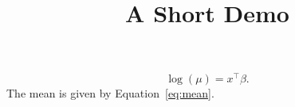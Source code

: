 \documentclass[article]{jss}
\title{A Short Demo}
\begin{document}
\begin{equation} \label{eq:mean}
\log(\mu) = x^\top \beta.
\end{equation}
The mean is given by Equation~\ref{eq:mean}.
\end{document}
